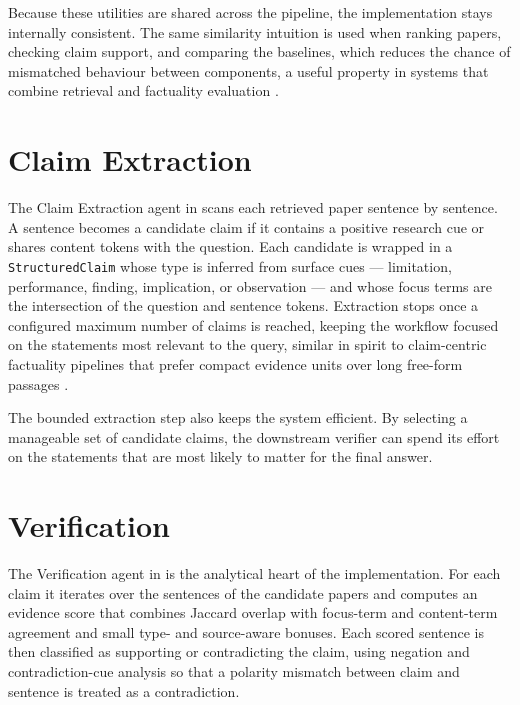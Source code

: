 Because these utilities are shared across the pipeline, the implementation stays internally consistent. The same
similarity intuition is used when ranking papers, checking claim support, and comparing the baselines, which
reduces the chance of mismatched behaviour between components, a useful property in systems that combine retrieval
and factuality evaluation \cite{min2023factscore,es2023ragas}.

\section{Claim Extraction }

The Claim Extraction agent in  scans each retrieved paper sentence by sentence. A
sentence becomes a candidate claim if it contains a positive research cue or shares content tokens with the
question. Each candidate is wrapped in a \texttt{StructuredClaim} whose type is inferred from surface cues ---
limitation, performance, finding, implication, or observation --- and whose focus terms are the intersection of the
question and sentence tokens. Extraction stops once a configured maximum number of claims is reached, keeping the
workflow focused on the statements most relevant to the query, similar in spirit to claim-centric factuality
pipelines that prefer compact evidence units over long free-form passages \cite{thorne2018fever,wadden2020scifact,honovich2022true}.

The bounded extraction step also keeps the system efficient. By selecting a manageable set of candidate claims, the
downstream verifier can spend its effort on the statements that are most likely to matter for the final answer.

\section{Verification }

The Verification agent in  is the analytical heart of the implementation. For each
claim it iterates over the sentences of the candidate papers and computes an evidence score that combines Jaccard
overlap with focus-term and content-term agreement and small type- and source-aware bonuses. Each scored sentence
is then classified as supporting or contradicting the claim, using negation and contradiction-cue analysis so that
a polarity mismatch between claim and sentence is treated as a contradiction.

